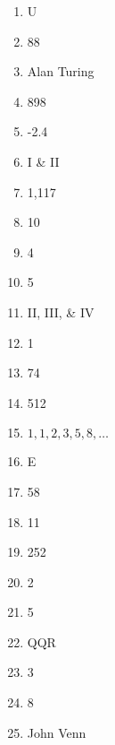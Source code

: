 \documentclass[../uilmath.tex]{subfiles}
\begin{document}
\begin{enumerate}[label=\bfseries\arabic*.]
    \item %
    U 

    \item %
    88

    \item %
    Alan Turing 

    \item %
    898

    \item %
    -2.4

    \item %
    I \& II 

    \item %
    1,117

    \item %
    10

    \item %
    4 

    \item %
    5

    \item %
    II, III, \& IV 

    \item %
    1

    \item %
    74

    \item %
    512

    \item %
    ${1,1,2,3,5,8,\dots}$

    \item %
    E 

    \item %
    58

    \item %
    11
    
    \item %
    252

    \item %
    2

    \item %
    5

    \item %
    QQR 

    \item %
    3

    \item %
    8

    \item %
    John Venn 


\end{enumerate}
\end{document}
